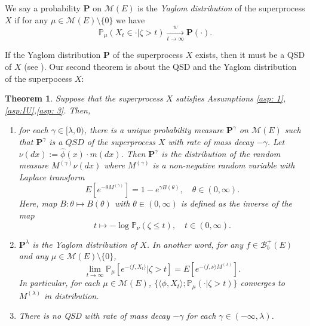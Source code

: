 \documentclass[12pt,a4paper]{amsart}
\theoremstyle{plain}
\newtheorem{thm}{Theorem}[section]
\theoremstyle{definition}
\numberwithin{equation}{section}
\begin{document}
	We say a probability ${\mathbf P}$ on $\mathcal M(E)$ is the \emph{Yaglom distribution} of the superprocess $X$ if for any $\mu\in \mathcal M(E)\setminus\{0\}$ we have
\[
	\mathbb P_\mu(X_t \in \cdot | \zeta > t) \xrightarrow[t\to \infty]{w} {\mathbf P}(\cdot).
\]

	If the Yaglom distribution ${\mathbf P}$ of the superprocess $X$ exists, then it must be a QSD of $X$
	(see \cite{MeleardVillemonais2012Quasi-stationary}).
	Our second theorem is about the QSD and the Yaglom distribution of the superpocess $X$:

\begin{thm}
\label{thm: qsd thm}
	Suppose that the superprocess $X$ satisfies Assumptions \ref{asp: 1},\ref{asp:IU},\ref{asp: 3}.  Then,
\begin{enumerate}
\item \label{thm: qsd thm 1}
	for each $\gamma\in[\lambda,0)$, there is a unique probability measure ${\mathbf P}^{\gamma}$ on $\mathcal M(E)$ such that $ {\mathbf P}^\gamma$ is a $QSD$ of the superprocess $X$ with rate of mass decay $-\gamma$.
	Let $\nu(dx):=\hat\phi(x)\cdot m(dx)$.
	Then ${\mathbf P}^\gamma$ is the distribution of the random measure $M^{(\gamma)}\nu(dx)$ where $M^{(\gamma)}$ is a non-negative random variable with Laplace transform
\[
	E[e^{-\theta M^{(\gamma)}}]
	= 1 - e^{\gamma B(\theta)},
	\quad \theta \in (0,\infty).
\]
	Here, map $B: \theta \mapsto B(\theta)$ with $\theta \in (0,\infty)$ is defined as the inverse of the map
\[
	t
	\mapsto -\log \mathbb P_\nu(\zeta \leq t),
	\quad t\in (0,\infty).
\]
\item
	${\mathbf P}^\lambda$ is the Yaglom distribution of $X$.
	In another word, for any  $f\in\mathcal B_b^+(E)$ and any $\mu\in \mathcal M(E)\setminus\{0\}$,
\[
	\lim_{t\rightarrow\infty}\mathbb P_{\mu}[e^{-\langle f,X_t\rangle} | \zeta>t]
	= E [e^{- \langle f,\nu\rangle M^{(\lambda)}}].
\]
	In particular, for each $\mu \in \mathcal M(E)$, $\{\langle \phi, X_t\rangle; \mathbb P_{\mu}(\cdot| \zeta > t) \}$ converges to $M^{(\lambda)}$ in distribution.
\item
	There is no QSD with rate of mass decay $-\gamma$ for each $\gamma\in(-\infty , \lambda)$.
\end{enumerate}
\end{thm}
\end{document}
